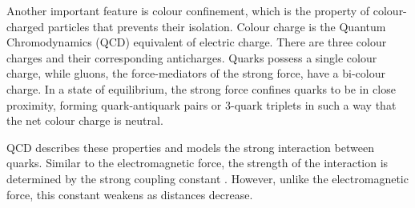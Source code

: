 Another important feature is colour confinement, which is the property of colour-charged particles that prevents their isolation.
Colour charge is the Quantum Chromodynamics (QCD) equivalent of electric charge.
There are three colour charges and their corresponding anticharges.
Quarks possess a single colour charge, while gluons, the force-mediators of the strong force, have a bi-colour charge.
In a state of equilibrium, the strong force confines quarks to be in close proximity, forming quark-antiquark pairs or 3-quark triplets in such a way that the net colour charge is neutral.

QCD describes these properties and models the strong interaction between quarks.
Similar to the electromagnetic force, the strength of the interaction is determined by the strong coupling constant \textalpha.
However, unlike the electromagnetic force, this constant weakens as distances decrease.
